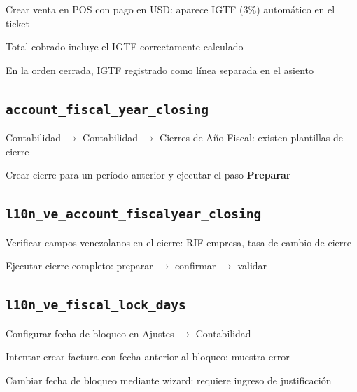 \documentclass[11pt,a4paper]{article}
\newcommand{\modulo}[1]{\texttt{\textcolor{naranja}{#1}}}
\begin{document}
\begin{Form}
\begin{checklist}
  \item Crear venta en POS con pago en USD: aparece IGTF (3\%) automático en el ticket
  \item Total cobrado incluye el IGTF correctamente calculado
  \item En la orden cerrada, IGTF registrado como línea separada en el asiento
\end{checklist}

\subsection{\modulo{account\_fiscal\_year\_closing}}

\begin{checklist}
  \item Contabilidad $\rightarrow$ Contabilidad $\rightarrow$ Cierres de Año Fiscal: existen plantillas de cierre
  \item Crear cierre para un período anterior y ejecutar el paso \textbf{Preparar}
\end{checklist}

\subsection{\modulo{l10n\_ve\_account\_fiscalyear\_closing}}

\begin{checklist}
  \item Verificar campos venezolanos en el cierre: RIF empresa, tasa de cambio de cierre
  \item Ejecutar cierre completo: preparar $\rightarrow$ confirmar $\rightarrow$ validar
\end{checklist}

\subsection{\modulo{l10n\_ve\_fiscal\_lock\_days}}

\begin{checklist}
  \item Configurar fecha de bloqueo en Ajustes $\rightarrow$ Contabilidad
  \item Intentar crear factura con fecha anterior al bloqueo: muestra error
  \item Cambiar fecha de bloqueo mediante wizard: requiere ingreso de justificación
\end{checklist}


\end{Form}
\end{document}

